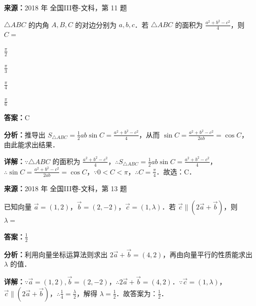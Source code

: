 \begin{question}[points=5]
\textbf{来源：}2018 年 全国III卷-文科，第 11 题\par
$\triangle ABC$ 的内角 $A,B,C$ 的对边分别为 $a,b,c$．若 $\triangle ABC$ 的面积为 $\frac{a^2+b^2-c^2}{4}$，则 $C=$
\begin{choices}
  \item $\frac{\pi}{2}$
  \item $\frac{\pi}{3}$
  \item $\frac{\pi}{4}$
  \item $\frac{\pi}{6}$
\end{choices}
\begin{solution}
\textbf{答案：}C

\textbf{分析：}推导出 $S_{\triangle ABC}= \frac{1}{2}ab\sin C = \frac{a^2+b^2-c^2}{4}$，从而 $\sin C = \frac{a^2+b^2-c^2}{2ab} = \cos C$，由此能求出结果．

\textbf{详解：}$\because \triangle ABC$ 的面积为 $\frac{a^2+b^2-c^2}{4}$，$\therefore S_{\triangle ABC}= \frac{1}{2}ab\sin C = \frac{a^2+b^2-c^2}{4}$，$\therefore \sin C = \frac{a^2+b^2-c^2}{2ab} = \cos C$，$\because 0<C<\pi$，$\therefore C=\frac{\pi}{4}$．故选：C．
\end{solution}
\end{question}

\begin{question}[points=5]
\textbf{来源：}2018 年 全国III卷-文科，第 13 题\par
已知向量 $\overrightarrow{a}=(1,2)$，$\overrightarrow{b}=(2,-2)$，$\overrightarrow{c}=(1,\lambda)$．若 $\overrightarrow{c}\parallel(2\overrightarrow{a}+\overrightarrow{b})$，则 $\lambda=$
\fillin[{$\frac{1}{2}$}]
\begin{solution}
\textbf{答案：}$\frac{1}{2}$

\textbf{分析：}利用向量坐标运算法则求出 $2\overrightarrow{a}+\overrightarrow{b}=(4,2)$，再由向量平行的性质能求出 $\lambda$ 的值．

\textbf{详解：}$\because \overrightarrow{a}=(1,2),\overrightarrow{b}=(2,-2)$，$\therefore 2\overrightarrow{a}+\overrightarrow{b}=(4,2)$．$\because \overrightarrow{c}=(1,\lambda)$，$\overrightarrow{c}\parallel(2\overrightarrow{a}+\overrightarrow{b})$，$\therefore \frac{1}{4} = \frac{\lambda}{2}$，解得 $\lambda=\frac{1}{2}$．故答案为：$\frac{1}{2}$．
\end{solution}
\end{question}

